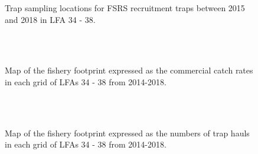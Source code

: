 \documentclass[11pt]{article}
\newcommand{\e}{/SpinDr/backup/bio_data/bio.lobster/figures/LFA3438Framework2019/} %
\begin{document}


   \begin{figure}
    \centering
        \caption{Trap sampling locations for FSRS recruitment traps between 2015 and 2018 in LFA 34 - 38.}

    \end{figure}




  \begin{figure}
        \centering
    \\
                \\
        
         \caption{Map of the fishery footprint expressed as the commercial catch rates in each grid of LFAs 34 - 38 from 2014-2018.}
        \end{figure}


\begin{figure}
        \centering
    \\
                \\
        
         \caption{Map of the fishery footprint expressed as the numbers of trap hauls in each grid of LFAs 34 - 38 from 2014-2018.}
        \end{figure}
\end{document}
